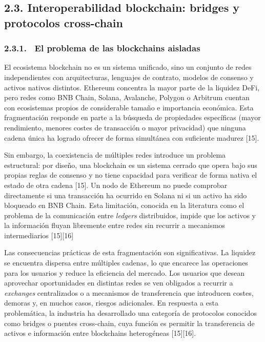 \subsection{2.3. Interoperabilidad blockchain: bridges y protocolos
cross-chain}\label{interoperabilidad-blockchain-bridges-y-protocolos-cross-chain}

\subsubsection{2.3.1. ~El problema de las blockchains
aisladas}\label{el-problema-de-las-blockchains-aisladas}

El ecosistema blockchain no es un sistema unificado, sino un conjunto de
redes independientes con arquitecturas, lenguajes de contrato, modelos
de consenso y activos nativos distintos. Ethereum concentra la mayor
parte de la liquidez DeFi, pero redes como BNB Chain, Solana, Avalanche,
Polygon o Arbitrum cuentan con ecosistemas propios de considerable
tamaño e importancia económica. Esta fragmentación responde en parte a
la búsqueda de propiedades específicas (mayor rendimiento, menores
costes de transacción o mayor privacidad) que ninguna cadena única ha
logrado ofrecer de forma simultánea con suficiente madurez {[}15{]}.

Sin embargo, la coexistencia de múltiples redes introduce un problema
estructural: por diseño, una blockchain es un sistema cerrado que opera
bajo sus propias reglas de consenso y no tiene capacidad para verificar
de forma nativa el estado de otra cadena {[}15{]}. Un nodo de Ethereum
no puede comprobar directamente si una transacción ha ocurrido en Solana
ni si un activo ha sido bloqueado en BNB Chain. Esta limitación,
conocida en la literatura como el problema de la comunicación entre
\emph{ledgers} distribuidos, impide que los activos y la información
fluyan libremente entre redes sin recurrir a mecanismos intermediarios
{[}15{]}{[}16{]}

Las consecuencias prácticas de esta fragmentación son significativas. La
liquidez se encuentra dispersa entre múltiples cadenas, lo que encarece
las operaciones para los usuarios y reduce la eficiencia del mercado.
Los usuarios que desean aprovechar oportunidades en distintas redes se
ven obligados a recurrir a \emph{exchanges} centralizados o a mecanismos
de transferencia que introducen costes, demoras y, en muchos casos,
riesgos adicionales. En respuesta a esta problemática, la industria ha
desarrollado una categoría de protocolos conocidos como bridges o
puentes cross-chain, cuya función es permitir la transferencia de
activos e información entre blockchains heterogéneas {[}15{]}{[}16{]}.

